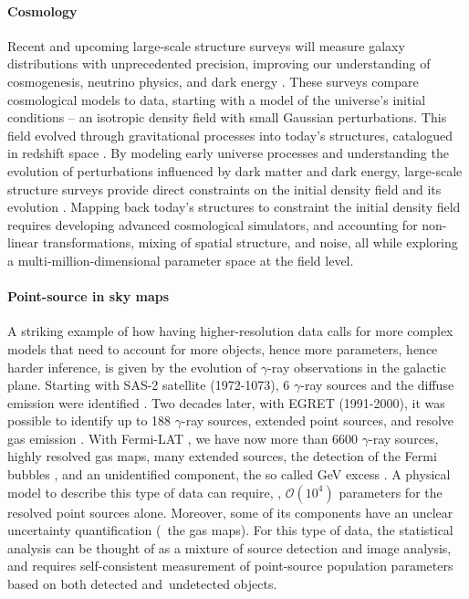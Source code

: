 \paragraph{Cosmology}
Recent and upcoming large-scale structure surveys will measure galaxy distributions with unprecedented precision, improving our understanding of cosmogenesis, neutrino physics, and dark energy \cite[\eg][]{LSSTDarkEnergyScience:2012kar, EUCLID:2011zbd}. These surveys compare cosmological models to data, starting with a model of the universe's initial conditions -- an isotropic density field with small Gaussian perturbations. This field evolved through gravitational processes into today's structures, catalogued in redshift space \cite{Bond:1995yt}. By modeling early universe processes and understanding the evolution of perturbations influenced by dark matter and dark energy, large-scale structure surveys provide direct constraints on the initial density field and its evolution \cite{Jasche:2012kq}. Mapping back today's structures to constraint the initial density field requires developing advanced cosmological simulators, and accounting for non-linear transformations, mixing of spatial structure, and noise, all while exploring a multi-million-dimensional parameter space at the field level.

\vspace{-0.4cm}
\paragraph{Point-source in sky maps} 
A striking example of how having higher-resolution data calls for more complex models that need to account for more objects, hence more parameters, hence harder inference, is given by the evolution of $\gamma$-ray observations in the galactic plane. Starting with SAS-2 satellite (1972-1073), 6 $\gamma$-ray sources and the diffuse emission were identified \cite{Sas26ps, sas2}. Two decades later, with EGRET (1991-2000), it was possible to identify up to 188 $\gamma$-ray sources, extended point sources, and resolve gas emission \cite{Casandjian:2008ky}. With Fermi-LAT \cite{Fermi-LAT:2022byn}, we have now more than 6600  $\gamma$-ray sources, highly resolved gas maps, many extended sources, the detection of the Fermi bubbles \cite{dobler2010fermi}, and an unidentified component, the so called GeV excess \cite{Goodenough:2009gk}. A physical model to describe this type of data can require, \eg, $\mathcal{O}(10^4)$ parameters for the resolved point sources alone. Moreover, some of its components have an unclear uncertainty quantification (\eg\ the gas maps). For this type of data, the statistical analysis can be thought of as a mixture of source detection and image analysis, and requires self-consistent measurement of point-source population parameters based on both detected and undetected objects.

